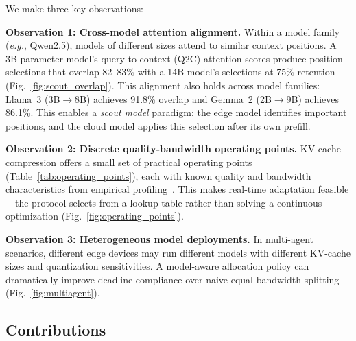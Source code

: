 \documentclass[conference]{IEEEtran}
\newcommand{\eg}{\textit{e.g.}\xspace}
\newcommand{\QtoC}{\textsc{Q2C}\xspace}
\begin{document}
We make three key observations:

\textbf{Observation 1: Cross-model attention alignment.}
Within a model family (\eg, Qwen2.5), models of different sizes attend to similar context positions.
A 3B-parameter model's query-to-context (\QtoC) attention scores produce position selections that overlap 82--83\% with a 14B model's selections at 75\% retention (Fig.~\ref{fig:scout_overlap}).
This alignment also holds across model families: Llama~3 (3B$\to$8B) achieves 91.8\% overlap and Gemma~2 (2B$\to$9B) achieves 86.1\%.
This enables a \emph{scout model} paradigm: the edge model identifies important positions, and the cloud model applies this selection after its own prefill.

\textbf{Observation 2: Discrete quality-bandwidth operating points.}
KV-cache compression offers a small set of practical operating points (Table~\ref{tab:operating_points}), each with known quality and bandwidth characteristics from empirical profiling~\cite{paperA}.
This makes real-time adaptation feasible---the protocol selects from a lookup table rather than solving a continuous optimization (Fig.~\ref{fig:operating_points}).

\textbf{Observation 3: Heterogeneous model deployments.}
In multi-agent scenarios, different edge devices may run different models with different KV-cache sizes and quantization sensitivities.
A model-aware allocation policy can dramatically improve deadline compliance over naive equal bandwidth splitting (Fig.~\ref{fig:multiagent}).

\subsection{Contributions}
\end{document}
